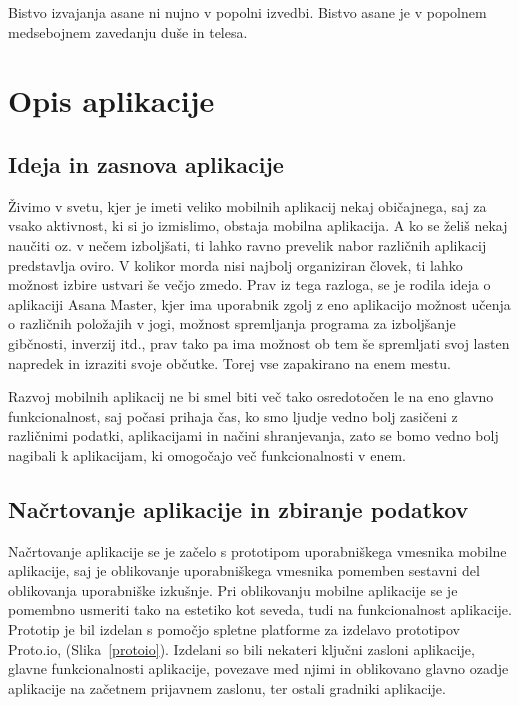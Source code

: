 \documentclass[a4paper, 12pt]{book}
\begin{document}
Bistvo izvajanja asane ni nujno v popolni izvedbi. Bistvo asane je v popolnem medsebojnem zavedanju duše in telesa.


\chapter{Opis aplikacije}
\label{ch1}

\section{Ideja in zasnova aplikacije}

Živimo v svetu, kjer je imeti veliko mobilnih aplikacij nekaj običajnega, saj za vsako aktivnost, ki si jo izmislimo, obstaja mobilna aplikacija. A ko se želiš nekaj naučiti oz. v nečem izboljšati, ti lahko ravno prevelik nabor različnih aplikacij predstavlja oviro. V kolikor morda nisi najbolj organiziran človek, ti lahko možnost izbire ustvari še večjo zmedo. Prav iz tega razloga, se je rodila ideja o aplikaciji Asana Master, kjer ima uporabnik zgolj z eno aplikacijo možnost učenja o različnih položajih v jogi, možnost spremljanja programa za izboljšanje gibčnosti, inverzij itd., prav tako pa ima možnost ob tem še spremljati svoj lasten napredek in izraziti svoje občutke. Torej vse zapakirano na enem mestu. 

Razvoj mobilnih aplikacij ne bi smel biti več tako osredotočen le na eno glavno funkcionalnost, saj počasi prihaja čas, ko smo ljudje vedno bolj zasičeni z različnimi podatki, aplikacijami in načini shranjevanja, zato se bomo vedno bolj nagibali k aplikacijam, ki omogočajo več funkcionalnosti v enem.

\section{Načrtovanje aplikacije in zbiranje podatkov}

Načrtovanje aplikacije se je začelo s prototipom uporabniškega vmesnika mobilne aplikacije, saj je oblikovanje uporabniškega vmesnika pomemben sestavni del oblikovanja uporabniške izkušnje. Pri oblikovanju mobilne aplikacije se je pomembno usmeriti tako na estetiko kot seveda, tudi na funkcionalnost aplikacije. Prototip je bil izdelan s pomočjo spletne platforme za izdelavo prototipov Proto.io, (Slika~\ref{protoio}). Izdelani so bili nekateri ključni zasloni aplikacije, glavne funkcionalnosti aplikacije, povezave med njimi in oblikovano glavno ozadje aplikacije na začetnem prijavnem zaslonu, ter ostali gradniki aplikacije.\\
\end{document}

